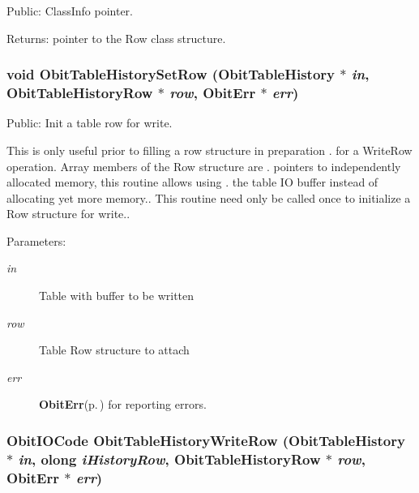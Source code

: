 Public: Class\-Info pointer. 

\begin{Desc}
\item[Returns:]pointer to the Row class structure. \end{Desc}
\subsubsection{\setlength{\rightskip}{0pt plus 5cm}void Obit\-Table\-History\-Set\-Row ({\bf Obit\-Table\-History} $\ast$ {\em in}, {\bf Obit\-Table\-History\-Row} $\ast$ {\em row}, {\bf Obit\-Err} $\ast$ {\em err})}\label{ObitTableHistory_8h_a19}


Public: Init a table row for write. 

This is only useful prior to filling a row structure in preparation . for a Write\-Row operation. Array members of the Row structure are . pointers to independently allocated memory, this routine allows using . the table IO buffer instead of allocating yet more memory.. This routine need only be called once to initialize a Row structure for write.. \begin{Desc}
\item[Parameters:]
\begin{description}
\item[{\em in}]Table with buffer to be written \item[{\em row}]Table Row structure to attach \item[{\em err}]{\bf Obit\-Err}{\rm (p.\,\pageref{structObitErr})} for reporting errors. \end{description}
\end{Desc}
\subsubsection{\setlength{\rightskip}{0pt plus 5cm}Obit\-IOCode Obit\-Table\-History\-Write\-Row ({\bf Obit\-Table\-History} $\ast$ {\em in}, {\bf olong} {\em i\-History\-Row}, {\bf Obit\-Table\-History\-Row} $\ast$ {\em row}, {\bf Obit\-Err} $\ast$ {\em err})}\label{ObitTableHistory_8h_a20}


